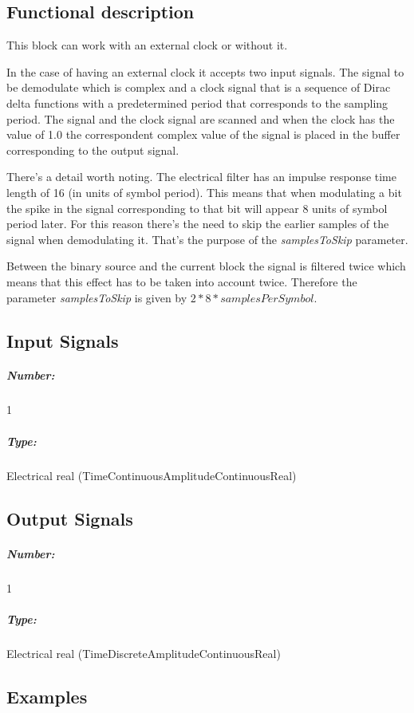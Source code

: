 \subsection*{Functional description}

This block can work with an external clock or without it. 

In the case of having an external clock it accepts two input signals. The signal to be demodulate which is complex and a clock signal that is a sequence of Dirac delta functions with a predetermined period that corresponds to the sampling period. The signal and the clock signal are scanned and when the clock has the value of 1.0 the correspondent complex value of the signal is placed in the buffer corresponding to the output signal.

There's a detail worth noting. The electrical filter has an impulse response time length of 16 (in units of symbol period). This means that when modulating a bit the spike in the signal corresponding to that bit will appear 8 units of symbol period later. For this reason there's the need to skip the earlier samples of the signal when demodulating it. That's the purpose of the \textit{samplesToSkip} parameter.

Between the binary source and the current block the signal is filtered twice which means that this effect has to be taken into account twice. Therefore the parameter \textit{samplesToSkip} is given by $2*8*samplesPerSymbol$. 

\subsection*{Input Signals}

\subparagraph*{Number:} 1

\subparagraph*{Type:} Electrical real (TimeContinuousAmplitudeContinuousReal)

\subsection*{Output Signals}

\subparagraph*{Number:} 1

\subparagraph*{Type:} Electrical real (TimeDiscreteAmplitudeContinuousReal)

\subsection*{Examples} 

